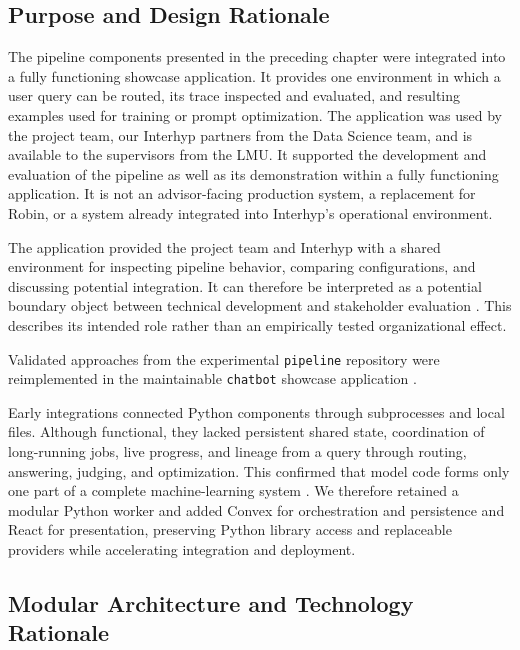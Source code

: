 \label{sec:chatbot-application}

\subsection{Purpose and Design Rationale}\label{sec:application-purpose}

The pipeline components presented in the preceding chapter were integrated into a fully functioning showcase application. It provides one environment in which a user query can be routed, its trace inspected and evaluated, and resulting examples used for training or prompt optimization. The application was used by the project team, our Interhyp partners from the Data Science team, and is available to the supervisors from the LMU. It supported the development and evaluation of the pipeline as well as its demonstration within a fully functioning application. It is not an advisor-facing production system, a replacement for Robin, or a system already integrated into Interhyp's operational environment.

The application provided the project team and Interhyp with a shared environment for inspecting pipeline behavior, comparing configurations, and discussing potential integration. It can therefore be interpreted as a potential boundary object between technical development and stakeholder evaluation \autocite{star-griesemer}. This describes its intended role rather than an empirically tested organizational effect.

Validated approaches from the experimental \texttt{pipeline} repository were reimplemented in the maintainable \texttt{chatbot} showcase application \autocite{amershi-ml-se}.

Early integrations connected Python components through subprocesses and local files. Although functional, they lacked persistent shared state, coordination of long-running jobs, live progress, and lineage from a query through routing, answering, judging, and optimization. This confirmed that model code forms only one part of a complete machine-learning system \autocite{sculley-technical-debt}. We therefore retained a modular Python worker and added Convex for orchestration and persistence and React for presentation, preserving Python library access and replaceable providers while accelerating integration and deployment.

\subsection{Modular Architecture and Technology Rationale}\label{sec:application-architecture}

